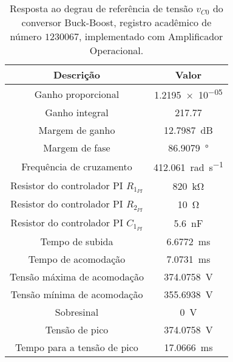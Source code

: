 \begin{table}[!ht]
\centering
\caption{Resposta ao degrau de referência de tensão $v_{C0}$ do conversor Buck-Boost, registro acadêmico de número $1230067$, implementado com Amplificador Operacional.}
\label{tab:resposta1malhaAmpOp}
\begin{tabular}{@{}cc@{}}
\toprule
\textbf{Descrição} & \textbf{Valor}\\ \midrule
Ganho proporcional & \SI{1.2195e-05}{}\\
Ganho integral & \SI{217.77}{}\\
Margem de ganho & \SI{12.7987}{\deci\bel}\\
Margem de fase & \SI{86.9079}{\degree}\\
Frequência de cruzamento & \SI{412.061}{\radian\per\s}\\
Resistor do controlador PI $R_{1_{PI}}$ & \SI{820}{\kilo\ohm}\\
Resistor do controlador PI $R_{2_{PI}}$ & \SI{10}{\ohm}\\
Resistor do controlador PI $C_{1_{PI}}$ & \SI{5.6}{\nano\F}\\
Tempo de subida & \SI{6.6772}{\milli\s}\\
Tempo de acomodação & \SI{7.0731}{\milli\s}\\
Tensão máxima de acomodação & \SI{374.0758}{\V}\\
Tensão mínima de acomodação & \SI{355.6938}{\V}\\
Sobresinal & \SI{0}{\V}\\
Tensão de pico & \SI{374.0758}{\V}\\
Tempo para a tensão de pico & \SI{17.0666}{\milli\s}\\
\bottomrule
\end{tabular}
\end{table}


